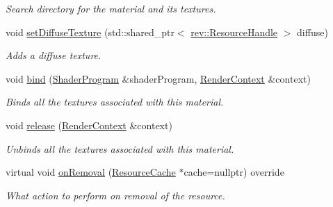 \begin{Indent}
\begin{DoxyCompactItemize}
\begin{DoxyCompactList}\small\item\em Search directory for the material and its textures. \end{DoxyCompactList}\item 
\mbox{\label{classrev_1_1_material_a0698c31c0012db2c0b53b3a9ad0e5fdf}} 
void \mbox{\hyperlink{classrev_1_1_material_a0698c31c0012db2c0b53b3a9ad0e5fdf}{set\+Diffuse\+Texture}} (std\+::shared\+\_\+ptr$<$ \mbox{\hyperlink{classrev_1_1_resource_handle}{rev\+::\+Resource\+Handle}} $>$ diffuse)
\begin{DoxyCompactList}\small\item\em Adds a diffuse texture. \end{DoxyCompactList}\item 
\mbox{\label{classrev_1_1_material_ac2556f63fbd4588e251a5a761f279613}} 
void \mbox{\hyperlink{classrev_1_1_material_ac2556f63fbd4588e251a5a761f279613}{bind}} (\mbox{\hyperlink{classrev_1_1_shader_program}{Shader\+Program}} \&shader\+Program, \mbox{\hyperlink{classrev_1_1_render_context}{Render\+Context}} \&context)
\begin{DoxyCompactList}\small\item\em Binds all the textures associated with this material. \end{DoxyCompactList}\item 
\mbox{\label{classrev_1_1_material_a7925671808c692f97c6fb80e746da145}} 
void \mbox{\hyperlink{classrev_1_1_material_a7925671808c692f97c6fb80e746da145}{release}} (\mbox{\hyperlink{classrev_1_1_render_context}{Render\+Context}} \&context)
\begin{DoxyCompactList}\small\item\em Unbinds all the textures associated with this material. \end{DoxyCompactList}\item 
\mbox{\label{classrev_1_1_material_aac07bf27f08e97412919f1c04597dcbc}} 
virtual void \mbox{\hyperlink{classrev_1_1_material_aac07bf27f08e97412919f1c04597dcbc}{on\+Removal}} (\mbox{\hyperlink{classrev_1_1_resource_cache}{Resource\+Cache}} $\ast$cache=nullptr) override
\begin{DoxyCompactList}\small\item\em What action to perform on removal of the resource. \end{DoxyCompactList}\end{DoxyCompactItemize}
\end{Indent}
